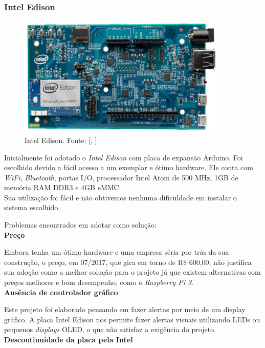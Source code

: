 \documentclass[
	12pt,				%
	oneside,			%
	a4paper,			%
	brazil				%
]{abntex2}
\newcommand{\citecustom}[1]{[\citeauthoronline{#1}, \citeyear{#1}]}
\begin{document}
{\subsubsection{Intel Edison}

\begin{figure}[H]
\centering
\includegraphics[width=10cm, center]{images/intel-edison-arduino-kit}
\caption{Intel Edison. Fonte: \citecustom{edisonimage}}
\label{Rotulo}
\end{figure}

Inicialmente foi adotado o \textit{Intel Edison} com placa de expansão Arduino. Foi escolhido devido a fácil acesso a um exemplar e ótimo hardware. Ele conta com \textit{WiFi}, \textit{Bluetooth}, portas I/O, processador Intel Atom de 500 MHz, 1GB de memória RAM DDR3 e 4GB eMMC. \\

Sua utilização foi fácil e não obtivemos nenhuma dificuldade em instalar o sistema escolhido.


Problemas encontrados em adotar como solução:
\\

\textbf{Preço}

Embora tenha um ótimo hardware e uma empresa séria por trás da sua construção, o preço, em 07/2017, que gira em torno de R\$ 600,00, não justifica sua adoção como a melhor solução para o projeto já que existem alternativas com preços melhores e bom desempenho, como o \textit{Raspberry Pi 3}.
\\

\textbf{Ausência de controlador gráfico}

Este projeto foi elaborado pensando em fazer alertas por meio de um display gráfico. A placa Intel Edison nos permite fazer alertas visuais utilizando LEDs ou pequenos \textit{displays} OLED, o que não satisfaz a exigência do projeto.  
\\

\textbf{Descontinuidade da placa pela Intel}

}
\end{document}
